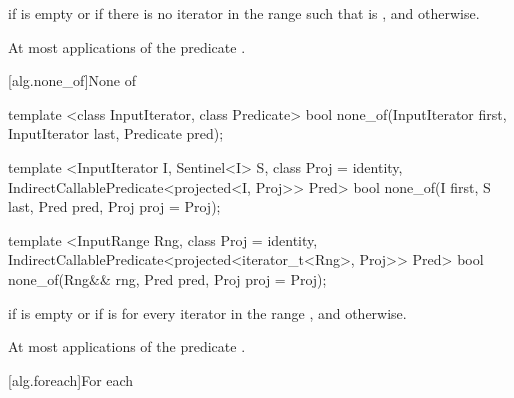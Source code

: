 \begin{itemdescr}
\pnum
\returns {} if  is empty or
if there is no iterator  in the range
 such that
is , and  otherwise.

\pnum
\complexity At most  applications of the predicate
.
\end{itemdescr}

[alg.none_of]{None of}

%
\begin{removedblock}
\begin{itemdecl}
template <class InputIterator, class Predicate>
  bool none_of(InputIterator first, InputIterator last, Predicate pred);
\end{itemdecl}
\end{removedblock}
\begin{addedblock}
\begin{itemdecl}
template <InputIterator I, Sentinel<I> S, class Proj = identity,
    IndirectCallablePredicate<projected<I, Proj>> Pred>
  bool none_of(I first, S last, Pred pred, Proj proj = Proj{});

template <InputRange Rng, class Proj = identity,
    IndirectCallablePredicate<projected<iterator_t<Rng>, Proj>> Pred>
  bool none_of(Rng&& rng, Pred pred, Proj proj = Proj{});
\end{itemdecl}
\end{addedblock}

\begin{itemdescr}
\pnum
\returns {} if
 is empty or if
is  for every iterator  in the range ,
and  otherwise.

\pnum
\complexity At most  applications of the predicate
.
\end{itemdescr}

[alg.foreach]{For each}

